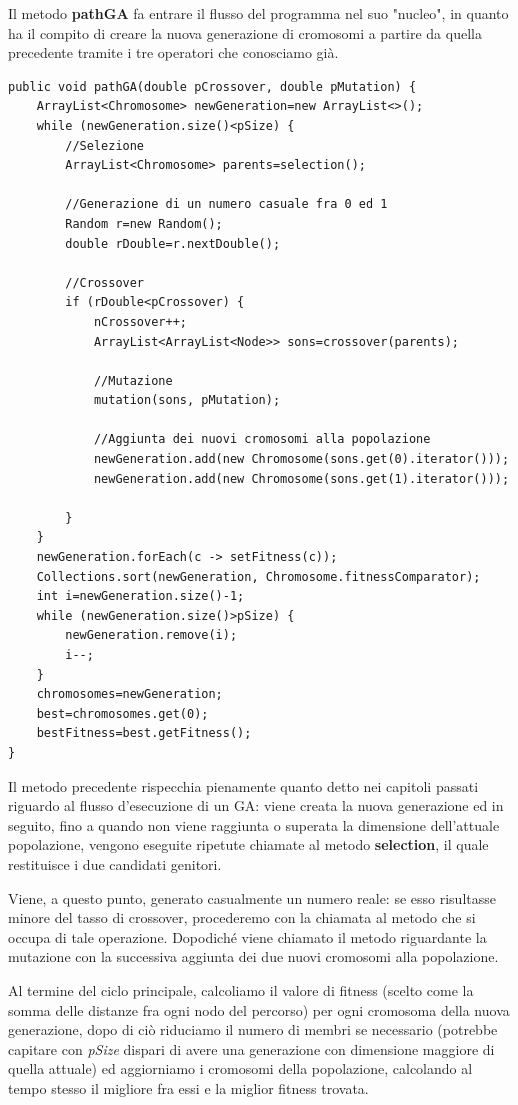 Il metodo \textbf{pathGA} fa entrare il flusso del programma nel suo "nucleo", in quanto ha il compito di creare la nuova generazione di cromosomi a partire da quella precedente tramite i tre operatori che conosciamo gi\`a.
\begin{lstlisting}[style=Java]
public void pathGA(double pCrossover, double pMutation) {
	ArrayList<Chromosome> newGeneration=new ArrayList<>();
	while (newGeneration.size()<pSize) {
		//Selezione
		ArrayList<Chromosome> parents=selection();
		
		//Generazione di un numero casuale fra 0 ed 1
		Random r=new Random();
		double rDouble=r.nextDouble();
		
		//Crossover
		if (rDouble<pCrossover) {
			nCrossover++;
			ArrayList<ArrayList<Node>> sons=crossover(parents);
			
			//Mutazione
			mutation(sons, pMutation);
			
			//Aggiunta dei nuovi cromosomi alla popolazione
			newGeneration.add(new Chromosome(sons.get(0).iterator()));
			newGeneration.add(new Chromosome(sons.get(1).iterator()));
			
		}
	}
	newGeneration.forEach(c -> setFitness(c));
	Collections.sort(newGeneration, Chromosome.fitnessComparator);
	int i=newGeneration.size()-1;
	while (newGeneration.size()>pSize) {
		newGeneration.remove(i);
		i--;
	}
	chromosomes=newGeneration;
	best=chromosomes.get(0);
	bestFitness=best.getFitness();
}
\end{lstlisting}
Il metodo precedente rispecchia pienamente quanto detto nei capitoli passati riguardo al flusso d'esecuzione di un GA: viene creata la nuova generazione ed in seguito, fino a quando non viene raggiunta o superata la dimensione dell'attuale popolazione, vengono eseguite ripetute chiamate al metodo \textbf{selection}, il quale restituisce i due candidati genitori.

Viene, a questo punto, generato casualmente un numero reale: se esso risultasse minore del tasso di crossover, procederemo con la chiamata al metodo che si occupa di tale operazione. Dopodich\'e viene chiamato il metodo riguardante la mutazione con la successiva aggiunta dei due nuovi cromosomi alla popolazione.

Al termine del ciclo principale, calcoliamo il valore di fitness (scelto come la somma delle distanze fra ogni nodo del percorso) per ogni cromosoma della nuova generazione, dopo di ci\`o riduciamo il numero di membri se necessario (potrebbe capitare con \textit{pSize} dispari di avere una generazione con dimensione maggiore di quella attuale) ed aggiorniamo i cromosomi della popolazione, calcolando al tempo stesso il migliore fra essi e la miglior fitness trovata.
\vspace{3mm}

